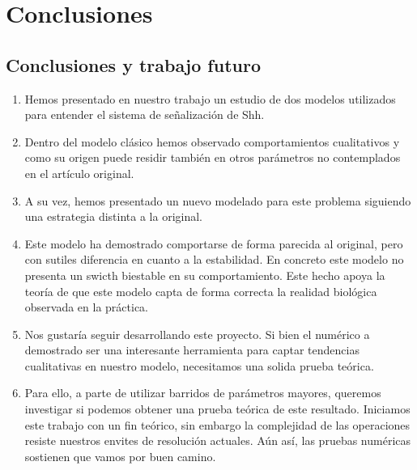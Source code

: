 
\chapter{Conclusiones}

\label{ch:conclusions}

\section{Conclusiones y trabajo futuro}
\begin{enumerate}
	\item Hemos presentado en nuestro trabajo un estudio de dos modelos utilizados para entender el sistema de señalización de Shh. 
	\item  Dentro del modelo clásico hemos observado comportamientos cualitativos y como su origen puede residir también en otros parámetros no contemplados en el artículo original.
	\item  A su vez, hemos presentado un nuevo modelado para este problema siguiendo una estrategia distinta a la original.
	\item Este modelo ha demostrado comportarse de forma parecida al original, pero con sutiles diferencia en cuanto a la estabilidad. En concreto este modelo no presenta un swicth biestable en su comportamiento. Este hecho apoya la teoría de que este modelo capta de forma correcta la realidad biológica observada en la práctica.
	\item Nos gustaría seguir desarrollando este proyecto. Si bien el numérico a demostrado ser una interesante herramienta para captar tendencias cualitativas en nuestro modelo, necesitamos una solida prueba teórica.
	\item Para ello, a parte de utilizar barridos de parámetros mayores, queremos investigar si podemos obtener una prueba teórica de este resultado. Iniciamos este trabajo con un fin teórico, sin embargo la complejidad de las operaciones resiste nuestros envites de resolución actuales. Aún así, las pruebas numéricas sostienen que vamos por buen camino.
\end{enumerate}



 

 
 
 
